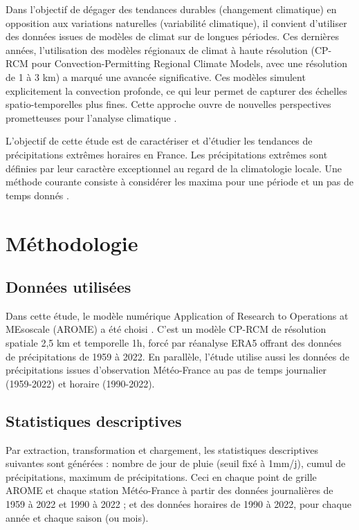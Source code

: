 \documentclass[
  article,
  nofooter,
  noheadings]{jss}
\begin{document}
Dans l'objectif de dégager des tendances durables (changement
climatique) en opposition aux variations naturelles (variabilité
climatique), il convient d'utiliser des données issues de modèles de
climat sur de longues périodes. Ces dernières années, l'utilisation des
modèles régionaux de climat à haute résolution (CP-RCM pour
Convection-Permitting Regional Climate Models, avec une résolution de 1
à 3 km) a marqué une avancée significative. Ces modèles simulent
explicitement la convection profonde, ce qui leur permet de capturer des
échelles spatio-temporelles plus fines. Cette approche ouvre de
nouvelles perspectives prometteuses pour l'analyse climatique
\citep{prein2015regional}.

L'objectif de cette étude est de caractériser et d'étudier les tendances
de précipitations extrêmes horaires en France. Les précipitations
extrêmes sont définies par leur caractère exceptionnel au regard de la
climatologie locale. Une méthode courante consiste à considérer les
maxima pour une période et un pas de temps donnés
\citep{blanchet2022instrumental}.

\section{Méthodologie}\label{muxe9thodologie}

\subsection{Données utilisées}\label{donnuxe9es-utilisuxe9es}

Dans cette étude, le modèle numérique Application of Research to
Operations at MEsoscale (AROME) a été choisi
\citep{caillaud2021simulation}. C'est un modèle CP-RCM de résolution
spatiale 2,5 km et temporelle 1h, forcé par réanalyse ERA5
\citep{hersbach2020era5} offrant des données de précipitations de 1959 à
2022. En parallèle, l'étude utilise aussi les données de précipitations
issues d'observation Météo-France \citep{meteofrance2024} au pas de
temps journalier (1959-2022) et horaire (1990-2022).

\subsection{Statistiques descriptives}\label{statistiques-descriptives}

Par extraction, transformation et chargement, les statistiques
descriptives suivantes sont générées : nombre de jour de pluie (seuil
fixé à 1mm/j), cumul de précipitations, maximum de précipitations. Ceci
en chaque point de grille AROME et chaque station Météo-France à partir
des données journalières de 1959 à 2022 et 1990 à 2022 ; et des données
horaires de 1990 à 2022, pour chaque année et chaque saison (ou mois).
\end{document}
